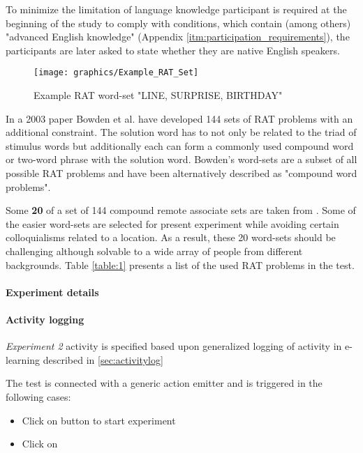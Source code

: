 		To minimize the limitation of language knowledge participant is required at the beginning of the study to comply with conditions, which contain (among others) "advanced English knowledge" (Appendix \ref{itm:participation_requirements}), the participants are later asked to state whether they are native English speakers.
		 
		
		
\begin{figure}[h]
	\centering
	\texttt{[image: graphics/Example\_RAT\_Set]}
	\caption{Example RAT word-set "LINE, SURPRISE, BIRTHDAY"}
	\label{fig:exampleratset}
\end{figure}


In a 2003 paper Bowden et al. \cite{Bowden} have developed 144 sets of RAT problems with an additional constraint. The solution word has to not only be related to the triad of stimulus words but additionally each can form a commonly used compound word or two-word phrase with the solution word.
Bowden's word-sets are a subset of all possible RAT problems and have been alternatively described as "compound word problems".
		
		Some \textbf{20} of a set of 144 compound remote associate sets are taken from \cite{Bowden}. Some of the easier word-sets are selected for present experiment while avoiding certain colloquialisms related to a location. As a result, these 20 word-sets should be challenging although solvable to a wide array of people from different backgrounds. Table \ref{table:1} presents a list of the used RAT problems in the test.
		
		
		\paragraph{Experiment details}
		
				
		\paragraph{Activity logging} \textit{Experiment 2} activity is specified based upon generalized logging of activity in e-learning described in \ref{sec:activitylog}
		
		The test is connected with a generic action emitter and is triggered in the following cases:
		
		\begin{itemize}
			\item Click on button to start experiment
			\item Click on 
		\end{itemize}

